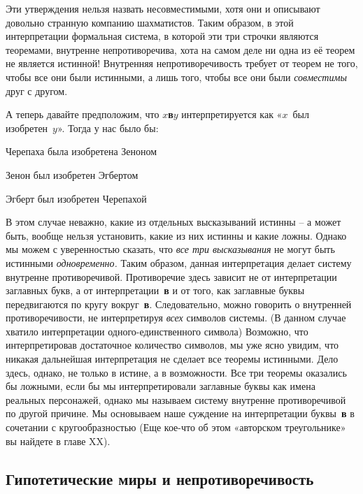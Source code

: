 \documentclass[../main.tex]{subfiles}
\begin{document}
Эти утверждения нельзя назвать несовместимыми, хотя они и описывают довольно странную компанию шахматистов. Таким образом, в этой интерпретации формальная система, в которой эти три строчки являются теоремами, внутренне непротиворечива, хота на самом деле ни одна из её теорем не является истинной! Внутренняя непротиворечивость требует от теорем не того, чтобы все они были истинными, а лишь того, чтобы все они были \emph{совместимы} друг с другом.

А теперь давайте предположим, что \textbf{$x$в$y$} интерпретируется как «$x$~был изобретен~$y$». Тогда у нас было бы:
%
\begin{block}
Черепаха была изобретена Зеноном

Зенон был изобретен Эгбертом

Эгберт был изобретен Черепахой
\end{block}

В этом случае неважно, какие из отдельных высказываний истинны \--- а может быть, вообще нельзя установить, какие из них истинны и какие ложны. Однако мы можем с уверенностью сказать, что \emph{все три высказывания} не могут быть истинными \emph{одновременно.} Таким образом, данная интерпретация делает систему внутренне противоречивой. Противоречие здесь зависит не от интерпретации заглавных букв, а от интерпретации~\textbf{в} и от того, как заглавные буквы передвигаются по кругу вокруг~\textbf{в}. Следовательно, можно говорить о внутренней противоречивости, не интерпретируя \emph{всех} символов системы. (В данном случае хватило интерпретации одного-единственного символа) Возможно, что интерпретировав достаточное количество символов, мы уже ясно увидим, что никакая дальнейшая интерпретация не сделает все теоремы истинными. Дело здесь, однако, не только в истине, а в возможности. Все три теоремы оказались бы ложными, если бы мы интерпретировали заглавные буквы как имена реальных персонажей, однако мы называем систему внутренне противоречивой по другой причине. Мы основываем наше суждение на интерпретации буквы~\textbf{в} в сочетании с кругообразностью (Еще кое-что об этом «авторском треугольнике» вы найдете в главе XX).


\subsection{Гипотетические миры и непротиворечивость}
\end{document}
